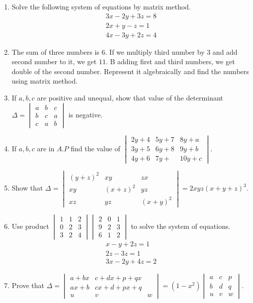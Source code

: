 \documentclass{article}
\theoremstyle{remark}
\begin{document}
\begin{enumerate}
\item Solve the following system of equations by matrix method.
\begin{align}
3x-2y+3z=8\\ 2x+y-z=1\\ 4x-3y+2z=4
\end{align}
\item The sum of three numbers is $6$. If we multiply third number by $3$ and add second number to it, we get $11$. B adding first and third numbers, we get double of the second number. Represent it algebraically and find the numbers using matrix method.
\item If $a, b, c$ are positive and unequal, show that value of the determinant $\Delta=\begin{vmatrix}a&b&c \\b&c&a \\c&a&b \end{vmatrix}$ is negative.
\item If $a, b, c$ are in $A.P$ find the value of $\begin{vmatrix}2y+4&5y+7&8y+a \\3y+5&6y+8&9y+b \\ 4y+6&7y+&10y+c\end{vmatrix}$.
\item Show that $\Delta=\begin{vmatrix}(y+z)^2&xy&zx \\ xy&(x+z)^2&yz\\ xz&yz&(x+y)^2 \end{vmatrix} = 2xyz(x+y+z)^3$.
\item Use product $\begin{vmatrix}1&1&2 \\0&2&3 \\3&2&4 \end{vmatrix} \begin{vmatrix}2&0&1 \\ 9&2&3 \\6&1&2 \end {vmatrix}$ to solve the system of equations.
\begin{align}
x-y+2z=1\\ 2z-3z=1\\ 3x-2y+4z=2
\end{align}
\item Prove that $\Delta = \begin{vmatrix}a+bx&c+dx+p+qx \\ ax+b&cx+d+px+q \\ u&v&w \end{vmatrix} = (1-x^2) \begin{vmatrix}a&c&p \\b&d&q \\u&v&w \end{vmatrix}$.
\end{enumerate}
\end{document}
